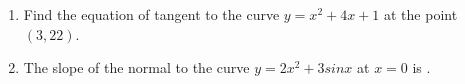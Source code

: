 \begin{enumerate}

\item Find the equation of tangent to the curve $y = x^2 + 4x + 1$ at the point $(3,22)$.

\item The slope of the normal to the curve $y = 2x^2 +3 sin x$ at $x=0$ is \underline{\hspace{1cm}}.

\end{enumerate}

